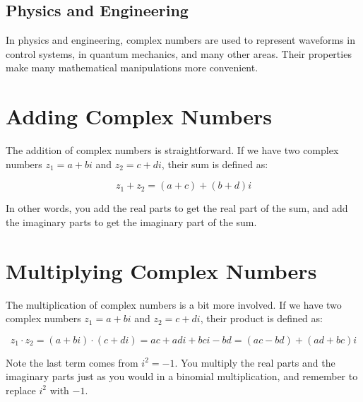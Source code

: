 \subsection{Physics and Engineering}

In physics and engineering, complex numbers are used to represent
waveforms in control systems, in quantum mechanics, and many other
areas. Their properties make many mathematical manipulations more
convenient.

\section{Adding Complex Numbers}

The addition of complex numbers is straightforward. If we have two
complex numbers $z_1 = a + bi$ and $z_2 = c + di$, their sum is
defined as:

\begin{equation}
z_1 + z_2 = (a + c) + (b + d)i
\end{equation}

In other words, you add the real parts to get the real part of the
sum, and add the imaginary parts to get the imaginary part of the sum.

\section{Multiplying Complex Numbers}

The multiplication of complex numbers is a bit more involved. If we
have two complex numbers $z_1 = a + bi$ and $z_2 = c + di$, their
product is defined as:

\begin{equation}
z_1 \cdot z_2 = (a + bi) \cdot (c + di) = ac + adi + bci - bd = (ac - bd) + (ad + bc)i
\end{equation}

Note the last term comes from $i^2 = -1$. You multiply the real parts
and the imaginary parts just as you would in a binomial
multiplication, and remember to replace $i^2$ with $-1$.


